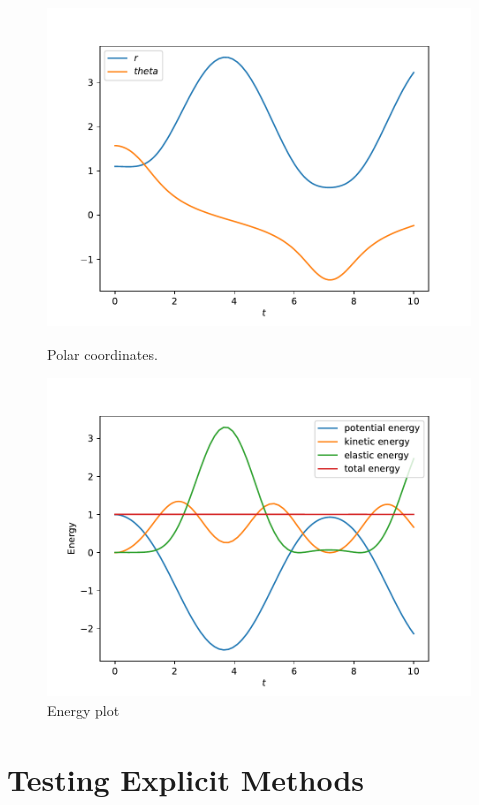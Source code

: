 \documentclass{scrartcl}
\begin{document}
\begin{figure}[h]
\centering
\begin{minipage}[b]{0.45\textwidth}
\centering
\includegraphics[width=\textwidth]{../Plots/Task4/Figure_0}
\caption{Polar coordinates.}
\label{pl:PolarPlot1}
\end{minipage}
\hfill
\begin{minipage}[b]{0.45\textwidth}
\centering
\includegraphics[width=\textwidth]{../Plots/Task4/Figure_3}
\caption{Energy plot}
\label{pl:EnergyPlot1}
\end{minipage}
\end{figure}

\section*{Testing Explicit Methods}
\end{document}
